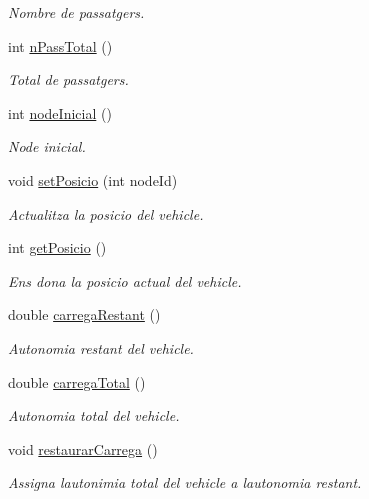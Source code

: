 \begin{DoxyCompactItemize}
\begin{DoxyCompactList}\small\item\em Nombre de passatgers. \end{DoxyCompactList}\item 
int \hyperlink{class_portam_a_pro_p_1_1_vehicle_adec927d972606ab6d3fcdfa113b46ce3}{n\+Pass\+Total} ()
\begin{DoxyCompactList}\small\item\em Total de passatgers. \end{DoxyCompactList}\item 
int \hyperlink{class_portam_a_pro_p_1_1_vehicle_ac21f14eaa0e69f35b33dee20d085cb3e}{node\+Inicial} ()
\begin{DoxyCompactList}\small\item\em Node inicial. \end{DoxyCompactList}\item 
void \hyperlink{class_portam_a_pro_p_1_1_vehicle_a36c3f9cd157876333245102034f297e3}{set\+Posicio} (int node\+Id)
\begin{DoxyCompactList}\small\item\em Actualitza la posicio del vehicle. \end{DoxyCompactList}\item 
int \hyperlink{class_portam_a_pro_p_1_1_vehicle_a56c8e150a14137bb6e0722d4d697c0c5}{get\+Posicio} ()
\begin{DoxyCompactList}\small\item\em Ens dona la posicio actual del vehicle. \end{DoxyCompactList}\item 
double \hyperlink{class_portam_a_pro_p_1_1_vehicle_a54547c7e60fb5f50cad5462ae4609562}{carrega\+Restant} ()
\begin{DoxyCompactList}\small\item\em Autonomia restant del vehicle. \end{DoxyCompactList}\item 
double \hyperlink{class_portam_a_pro_p_1_1_vehicle_aec1dd0d3144f2b4196e589fa1f9bc81b}{carrega\+Total} ()
\begin{DoxyCompactList}\small\item\em Autonomia total del vehicle. \end{DoxyCompactList}\item 
void \hyperlink{class_portam_a_pro_p_1_1_vehicle_a2d2bd58e6b614ff9cbbf4229cdc19e8e}{restaurar\+Carrega} ()
\begin{DoxyCompactList}\small\item\em Assigna l\textquotesingle{}autonimia total del vehicle a l\textquotesingle{}autonomia restant. \end{DoxyCompactList}\item 

\end{DoxyCompactItemize}
